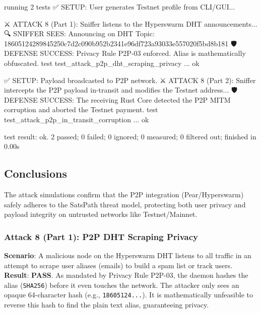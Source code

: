 \documentclass[
]{article}
\newenvironment{Shaded}{}{}
\newcommand{\NormalTok}[1]{#1}
\begin{document}
\begin{Shaded}
\begin{Highlighting}[]
\NormalTok{running 2 tests}
\NormalTok{✅ SETUP: User generates Testnet profile from CLI/GUI...}

\NormalTok{⚔️ ATTACK 8 (Part 1): Sniffer listens to the Hyperswarm DHT announcements...}
\NormalTok{🔍 SNIFFER SEES: Announcing on DHT Topic: 18605124289845250c7d2c090b952b2341e96df723a93033e557020f5bd8b181}
\NormalTok{🛡️ DEFENSE SUCCESS: Privacy Rule P2P{-}03 enforced. Alias is mathematically obfuscated.}
\NormalTok{test test\_attack\_p2p\_dht\_scraping\_privacy ... ok}

\NormalTok{✅ SETUP: Payload broadcasted to P2P network.}
\NormalTok{⚔️ ATTACK 8 (Part 2): Sniffer intercepts the P2P payload in{-}transit and modifies the Testnet address...}
\NormalTok{🛡️ DEFENSE SUCCESS: The receiving Rust Core detected the P2P MITM corruption and aborted the Testnet payment.}
\NormalTok{test test\_attack\_p2p\_in\_transit\_corruption ... ok}

\NormalTok{test result: ok. 2 passed; 0 failed; 0 ignored; 0 measured; 0 filtered out; finished in 0.00s}
\end{Highlighting}
\end{Shaded}

\hypertarget{conclusions-3}{%
\subsection{Conclusions}\label{conclusions-3}}

The attack simulations confirm that the P2P integration
(Pear/Hyperswarm) safely adheres to the SatsPath threat model,
protecting both user privacy and payload integrity on untrusted networks
like Testnet/Mainnet.

\hypertarget{attack-8-part-1-p2p-dht-scraping-privacy}{%
\subsubsection{Attack 8 (Part 1): P2P DHT Scraping
Privacy}\label{attack-8-part-1-p2p-dht-scraping-privacy}}

\textbf{Scenario}: A malicious node on the Hyperswarm DHT listens to all
traffic in an attempt to scrape user aliases (emails) to build a spam
list or track users. \textbf{Result}: \textbf{PASS}. As mandated by
Privacy Rule P2P-03, the daemon hashes the alias (\texttt{SHA256})
before it even touches the network. The attacker only sees an opaque
64-character hash (e.g., \texttt{18605124...}). It is mathematically
unfeasible to reverse this hash to find the plain text alias,
guaranteeing privacy.
\end{document}

